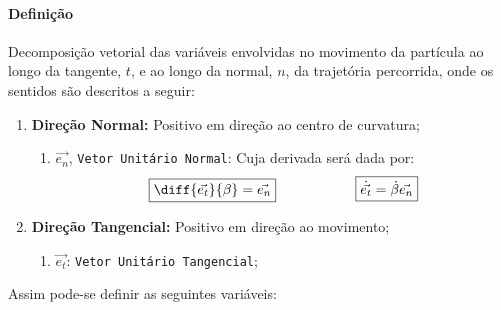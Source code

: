 \documentclass{article}
\begin{document}
            \paragraph{Definição}Decomposição vetorial das variáveis envolvidas no movimento da partícula ao longo da tangente, $t$, e ao longo da normal, $n$, da trajetória percorrida, onde os sentidos são descritos a seguir:
                \begin{enumerate}[noitemsep]
                    \item \textbf{Direção Normal:} Positivo em direção ao centro de curvatura;
                        \begin{enumerate}[noitemsep]
                            \item $\vec{e_{n}}$, \texttt{Vetor Unitário Normal}: Cuja derivada será dada por:
                                \[
                                    \boxed{
                                        \diff{\vec{e_{t}}}{\beta} = \vec{e_{n}}
                                    }
                                    \hspace{20mm}
                                    \boxed{
                                        \dot{\vec{e_{t}}} = \dot{\beta}\vec{e_{n}}
                                    }
                                \]
                        \end{enumerate}
                    \item \textbf{Direção Tangencial:} Positivo em direção ao movimento;
                        \begin{enumerate}[noitemsep]
                            \item $\vec{e_{t}}$: \texttt{Vetor Unitário Tangencial};
                        \end{enumerate}
                \end{enumerate}
            Assim pode-se definir as seguintes variáveis:
\end{document}

